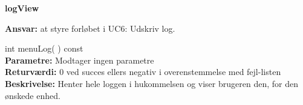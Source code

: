 {\centering
\textbf{logView}\par
}
\textbf{Ansvar:} at styre forløbet i UC6: Udskriv log. \

int menuLog( ) const \\
\textbf{Parametre:} Modtager ingen parametre \\
\textbf{Returværdi:} 0 ved succes ellers negativ i overenstemmelse med fejl-listen \\
\textbf{Beskrivelse:} Henter hele loggen i hukommelsen og viser brugeren den, for den ønskede enhed.\\

